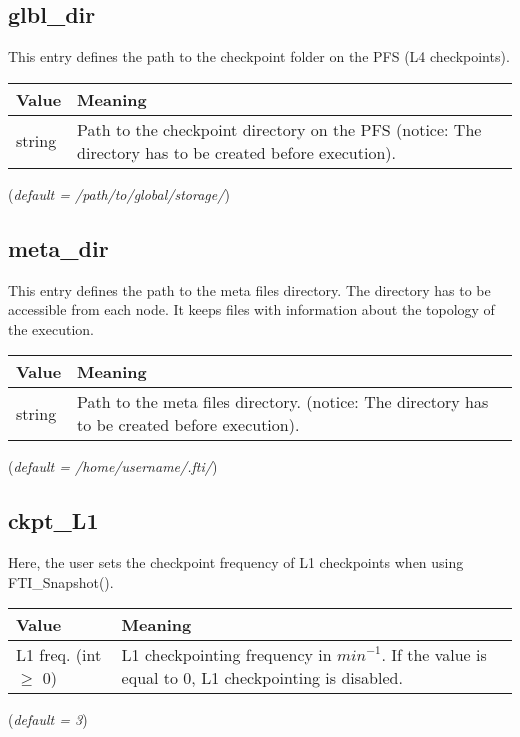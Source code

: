 \documentclass{refrep}
\begin{document}
\subsection{glbl\_dir}\label{subsec:glbldir}
This entry defines the path to the checkpoint folder on the PFS (L4 checkpoints).
\begin{center}
\begin{tabular}[h!]{|p{}|p{}|}
\hline
\textbf{Value} & \textbf{Meaning} \\ \hline
string & Path to the checkpoint directory on the PFS (notice: The directory has to be created before execution). \\ \hline
\end{tabular}
\end{center}
(\textit{default = /path/to/global/storage/})
\subsection{meta\_dir}\label{subsec:metadir}
This entry defines the path to the meta files directory. The directory has to be accessible from each node. It keeps files with information about the topology of the execution.
\begin{center}
\begin{tabular}[h!]{|p{}|p{}|}
\hline
\textbf{Value} & \textbf{Meaning} \\ \hline
string & Path to the meta files directory. (notice: The directory has to be created before execution). \\ \hline
\end{tabular}
\end{center}
(\textit{default = /home/username/.fti/})
\subsection{ckpt\_L1}\label{subsec:ckptl1}
Here, the user sets the checkpoint frequency of L1 checkpoints when using FTI\_Snapshot().
\begin{center}
\begin{tabular}[h!]{|p{}|p{}|}
\hline
\textbf{Value} & \textbf{Meaning} \\ \hline
L1 freq. (int $\geq$ 0)  & L1 checkpointing frequency in $\textit{min}^{-1}$. If the value is equal to 0, L1 checkpointing is disabled.  \\ \hline
\end{tabular}
\end{center}
(\textit{default = 3})
\end{document}
